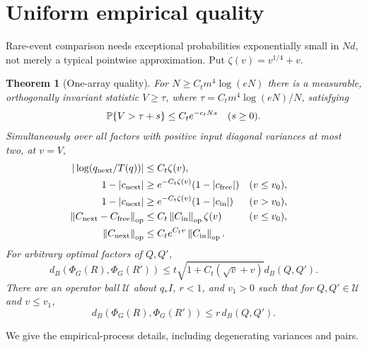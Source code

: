 \documentclass[11pt]{article}
\newtheorem{theorem}{Theorem}[section]\newtheorem{lemma}[theorem]{Lemma}
\newcommand{\norm}[1]{\left\lVert#1\right\rVert}
\begin{document}
\section{Uniform empirical quality}\label{sec:quality}
Rare-event comparison needs exceptional probabilities exponentially small in $Nd$, not merely a typical pointwise approximation. Put $\zeta(v)=v^{1/4}+v$.
\begin{theorem}[One-array quality]\label{thm:quality}
For $N\ge C_tm^4\log(eN)$ there is a measurable, orthogonally invariant statistic $V\ge\tau$, where $\tau=C_tm^4\log(eN)/N$, satisfying
\begin{equation}\label{eq:qualitytail}
 \mathbb P\{V>\tau+s\}\le C_te^{-c_tNs}\quad(s\ge0).
\end{equation}
Simultaneously over all factors with positive input diagonal variances at most two, at $v=V$,
\begin{align}
 |\log(q_{\rm next}/T(q))|&\le C_t\zeta(v),\label{eq:scalarq}\\
 1-|c_{\rm next}|&\ge e^{-C_t\zeta(v)}(1-|c_{\rm free}|)
                                      &&(v\le v_0),\label{eq:pairsmall}\\
 1-|c_{\rm next}|&\ge e^{-C_t\zeta(v)}(1-|c_{\rm in}|)
                                      &&(v>v_0),\label{eq:pairlarge}\\
 \norm{C_{\rm next}-C_{\rm free}}_{\op}
      &\le C_t\norm{C_{\rm in}}_{\op}\zeta(v)
                                      &&(v\le v_0),\label{eq:matrixsmall}\\
 \norm{C_{\rm next}}_{\op}&\le C_te^{C_tv}\norm{C_{\rm in}}_{\op}.\label{eq:matrixlarge}
\end{align}
For arbitrary optimal factors of $Q,Q'$,
\begin{equation}\label{eq:globalgain}
 d_B(\Phi_G(R),\Phi_G(R'))\le t\sqrt{1+C_t(\sqrt v+v)}d_B(Q,Q').
\end{equation}
There are an operator ball $\mathcal U$ about $q_*I$, $r<1$, and $v_1>0$ such that for $Q,Q'\in\mathcal U$ and $v\le v_1$,
\begin{equation}\label{eq:localgain}
 d_B(\Phi_G(R),\Phi_G(R'))\le r\,d_B(Q,Q').
\end{equation}
\end{theorem}
We give the empirical-process details, including degenerating variances and pairs.
\end{document}
